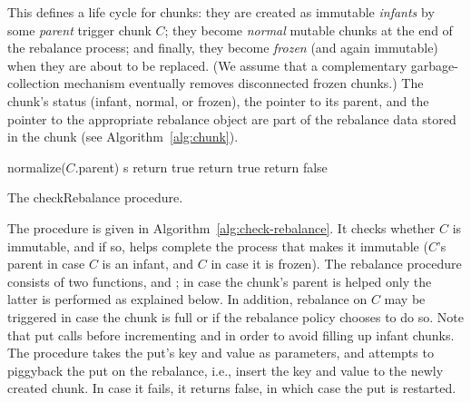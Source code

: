 This defines a life cycle for chunks: they are created as immutable \emph{infants} by some \emph{parent} trigger chunk $C$;
they become \emph{normal} mutable chunks at the end of the rebalance process; and finally, they become \emph{frozen}
(and again immutable) when they are about to be replaced.
(We assume that a complementary garbage-collection mechanism eventually removes disconnected frozen chunks.)
The chunk's status (infant, normal, or frozen), the pointer to its parent, and the pointer to the appropriate rebalance object are part of the rebalance data
stored in the chunk (see Algorithm~\ref{alg:chunk}).



\begin{algorithm}[tb]
	\begin{algorithmic}[1]{}
			\State normalize($C$.parent)
			\State {} s
			\State return true
		\EndIf
			  \EndIf 
			\State return true
		\EndIf
		\State return false
		\EndProcedure
	\end{algorithmic}
\caption{The checkRebalance procedure.}
\label{alg:check-rebalance}
\end{algorithm}	


The  procedure is given in Algorithm~\ref{alg:check-rebalance}. 
It checks whether $C$ is immutable, and if so, helps complete the process that makes it immutable
($C$'s parent in case $C$ is an infant, and $C$ in case it is frozen).
The rebalance procedure consists of two functions,  and ; in case
the chunk's parent is helped only the latter is performed as explained below.
In addition, rebalance on $C$ may be triggered in case the chunk is full or if the rebalance policy chooses to do so.
Note that put calls  before incrementing  and  in order to avoid filling up infant chunks.
The  procedure takes the put's key and value as parameters, and attempts to piggyback the put on the rebalance, i.e., insert the key and value to the newly created chunk. In case it fails, it returns false, in which case the put is restarted. 

